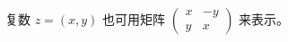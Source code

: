 复数 $z = (x,y)$ 也可用矩阵 \begin{math}
\left( \begin{smallmatrix}
x & -y \\ y & x
\end{smallmatrix} \right)
\end{math} 来表示。
